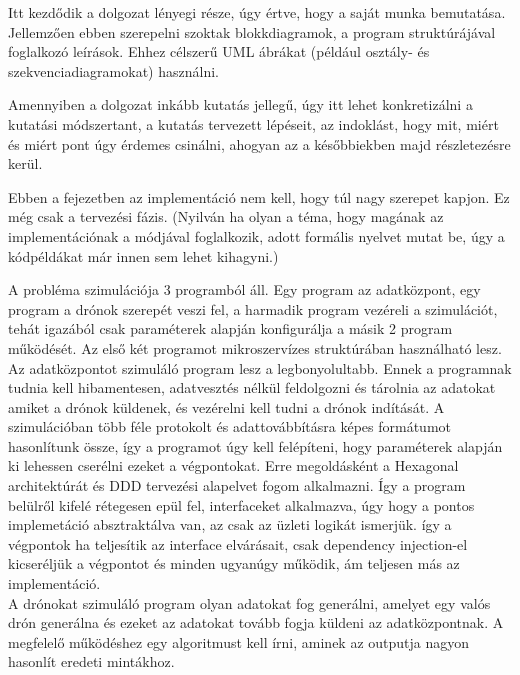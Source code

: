 
Itt kezdődik a dolgozat lényegi része, úgy értve, hogy a saját munka bemutatása.
Jellemzően ebben szerepelni szoktak blokkdiagramok, a program struktúrájával foglalkozó leírások.
Ehhez célszerű UML ábrákat (például osztály- és szekvenciadiagramokat) használni.

Amennyiben a dolgozat inkább kutatás jellegű, úgy itt lehet konkretizálni a kutatási módszertant, a kutatás tervezett lépéseit, az indoklást, hogy mit, miért és miért pont úgy érdemes csinálni, ahogyan az a későbbiekben majd részletezésre kerül.

Ebben a fejezetben az implementáció nem kell, hogy túl nagy szerepet kapjon.
Ez még csak a tervezési fázis.
(Nyilván ha olyan a téma, hogy magának az implementációnak a módjával foglalkozik, adott formális nyelvet mutat be, úgy a kódpéldákat már innen sem lehet kihagyni.)

A probléma szimulációja 3 programból áll. Egy program az adatközpont, egy program a drónok szerepét veszi fel, a harmadik program vezéreli a szimulációt,
tehát igazából csak paraméterek alapján konfigurálja a másik 2 program működését. Az első két programot mikroszervízes struktúrában használható lesz.\\
Az adatközpontot szimuláló program lesz a legbonyolultabb. Ennek a programnak tudnia kell hibamentesen, adatvesztés nélkül
feldolgozni és tárolnia az adatokat amiket a drónok küldenek, és vezérelni kell tudni a drónok indítását.
A szimulációban több féle protokolt és adattovábbításra képes formátumot hasonlítunk össze, így a programot úgy kell felépíteni,
hogy paraméterek alapján ki lehessen cserélni ezeket a végpontokat.
Erre megoldásként a Hexagonal architektúrát és DDD tervezési alapelvet fogom alkalmazni.
Így a program belülről kifelé rétegesen epül fel, interfaceket alkalmazva, úgy hogy a pontos implemetáció absztraktálva van, az csak az üzleti logikát ismerjük.
így a végpontok ha teljesítik az interface elvárásait, csak dependency injection-el kicseréljük a végpontot és minden ugyanúgy működik, ám teljesen más az implementáció.\\
A drónokat szimuláló program olyan adatokat fog generálni, amelyet egy valós drón generálna és ezeket az adatokat tovább fogja küldeni az adatközpontnak.
A megfelelő működéshez egy algoritmust kell írni, aminek az outputja nagyon hasonlít eredeti mintákhoz.

